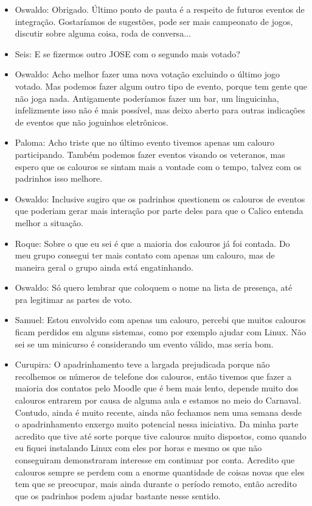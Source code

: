 \documentclass{ata-calico}
\begin{document}
\begin{itemize}
\item Oswaldo: Obrigado. Último ponto de pauta é a respeito de futuros eventos de integração. Gostaríamos de sugestões, pode ser mais campeonato de jogos, discutir sobre alguma coisa, roda de conversa...

\item Seis: E se fizermos outro JOSE com o segundo mais votado?

\item Oswaldo: Acho melhor fazer uma nova votação excluindo o último jogo votado. Mas podemos fazer algum outro tipo de evento, porque tem gente que não joga nada. Antigamente poderíamos fazer um bar, um linguicinha, infelizmente isso não é mais possível,  mas deixo aberto para outras indicações de eventos que não joguinhos eletrônicos.

\item Paloma: Acho triste que no último evento tivemos apenas um calouro participando. Também podemos fazer eventos visando os veteranos, mas espero que os calouros se sintam mais a vontade com o tempo, talvez com os padrinhos isso melhore.

\item Oswaldo: Inclusive sugiro que os padrinhos questionem os calouros de eventos que poderiam gerar mais interação por parte deles para que o Calico entenda melhor a situação.

\item Roque: Sobre o que eu sei é que a maioria dos calouros já foi contada. Do meu grupo consegui ter mais contato com apenas um calouro, mas de maneira geral o grupo ainda está engatinhando.

\item Oswaldo: Só quero lembrar que coloquem o nome na lista de presença, até pra legitimar as partes de voto.

\item Samuel: Estou envolvido com apenas um calouro, percebi que muitos calouros ficam perdidos em alguns sistemas, como por exemplo ajudar com Linux. Não sei se um minicurso é considerando um evento válido, mas seria bom.

\item Curupira: O apadrinhamento teve a largada prejudicada porque não recolhemos os números de telefone dos calouros, então tivemos que fazer a maioria dos contatos pelo Moodle que é bem mais lento, depende muito dos calouros entrarem por causa de alguma aula e estamos no meio do Carnaval. Contudo, ainda é muito recente, ainda não fechamos nem uma semana desde o apadrinhamento enxergo muito potencial nessa iniciativa. Da minha parte acredito que tive até sorte porque tive calouros muito dispostos, como quando eu fiquei instalando Linux com eles por horas e mesmo os que não conseguiram demonstraram interesse em continuar por conta. Acredito que calouros sempre se perdem com a enorme quantidade de coisas novas que eles tem que se preocupar, mais ainda durante o período remoto, então acredito que os padrinhos podem ajudar bastante nesse sentido.


\end{itemize}
\end{document}
